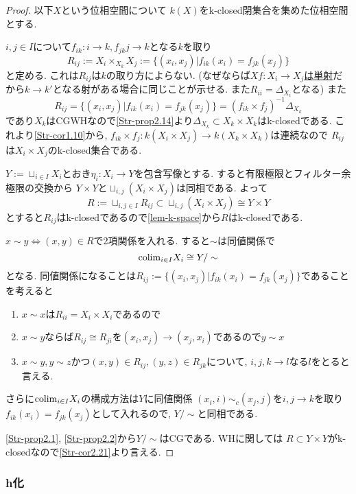 \documentclass[dvipdfmx,a4paper,11pt]{article}
\newcommand{\colim}{{\rm colim}}
\theoremstyle{definition}
\begin{document}
\begin{proof}
以下$X$という位相空間について
$k(X)$をk-closed閉集合を集めた位相空間とする. 


$i,j \in I$について$f_{ik}:i \to k, f_{jk}j \to k$となる$k$を取り
$$
R_{ij}:= X_{i} \times_{X_{k}} X_{j} := \{ (x_i, x_j) | f_{ik}(x_i) = f_{jk}(x_j)\}
$$
と定める. 
これは$R_{ij}$は$k$の取り方によらない. 
(なぜならば\underline{$Xf : X_i \to X_j$は単射}だから$k \to k'$となる射がある場合に同じことが示せる. また$R_{ii}= \Delta_{X_i}$となる)
また
$$
R_{ij}=\{ (x_i, x_j) | f_{ik}(x_i) = f_{jk}(x_j)\} = (f_{ik} \times f_{j})^{-1}\Delta_{X_k}
$$
であり$X_k$はCGWHなので\ref{Str-prop2.14}より$\Delta_{X_{k}} \subset X_k \times X_k$はk-closedである.
これより\ref{Str-cor1.10}から, $f_{ik} \times f_{j} : k(X_i \times X_j) \to k(X_k \times X_k)$は連続なので
$R_{ij}$は$X_i \times X_j$のk-closed集合である. 

$Y :=\sqcup_{i \in I}X_{i}$とおき$\eta_i : X_i \to Y$を包含写像とする. 
すると有限極限とフィルター余極限の交換から
$Y \times Y $と$ \sqcup_{i,j} (X_i \times X_j) $は同相である. 
よって
$$
R := \sqcup_{i,j \in I}R_{ij} \subset \sqcup_{i,j} (X_i \times X_j) \cong Y \times Y
$$
とすると$R_{ij}$はk-closedであるので\ref{lem-k-space}から$R$はk-closedである. 

$x \sim y \Leftrightarrow (x,y) \in R$で2項関係を入れる.
すると$\sim$は同値関係で
$$
\colim_{i \in I}X_i  \cong Y/\sim
$$ 
となる.
同値関係になることは$R_{ij}:= \{ (x_i, x_j) | f_{ik}(x_i) = f_{jk}(x_j)\}$であることを考えると
\begin{enumerate}
\item  $x \sim x$は$R_{ii}=X_{i} \times X_{i}$であるので
\item $x \sim y$ならば$R_{ij} \cong R_{ji}$を$(x_i, x_j) \to (x_j, x_i)$であるので$y \sim x$
\item $x \sim y, y \sim z$かつ$(x,y) \in R_{ij}, (y,z) \in R_{jk}$について, $i,j,k \to l$なる$l$をとると言える. 
\end{enumerate}
さらに$\colim_{i \in I}X_i  $の構成方法は$Y$に同値関係
$(x_i, i)\sim_{c} (x_j, j)$を$i,j \to k$を取り$f_{ik}(x_i) = f_{jk}(x_j)$として入れるので, $Y/\sim$と同相である.

\ref{Str-prop2.1}, \ref{Str-prop2.2}から$Y/\sim$はCGである.
WHに関しては
$R \subset Y \times Y$がk-closedなので\ref{Str-cor2.21}より言える.

\end{proof}

\subsubsection{h化}
\end{document}
